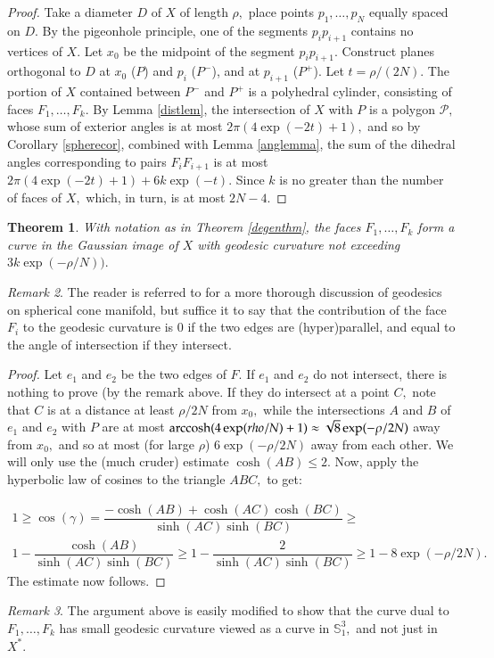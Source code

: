 \documentclass[12pt]{amsart}
\DeclareMathOperator{\acosh}{arccosh}
\newtheorem{theorem}{Theorem}
\theoremstyle{remark}
\newtheorem{remark}[theorem]{Remark}
\begin{document}
\begin{proof}
Take a diameter $D$ of $X$  of length $\rho,$ place points $p_1, \dotsc, p_N$ equally spaced on $D.$ By the pigeonhole principle, one of the segments $p_ip_{i+1}$ contains no vertices of $X.$ Let $x_0$ be the midpoint of the segment $p_ip_{i+1}.$ Construct planes orthogonal to $D$ at $x_0$ ($P$) and $p_i$ ($P^-$), and at $p_{i+1}$ ($P^+$). Let $t=\rho/(2N).$ The portion of $X$ contained between $P^-$ and $P^+$ is a polyhedral cylinder, consisting of faces $F_1, \dots, F_k.$ By Lemma \ref{distlem}, the intersection of $X$ with $P$ is a polygon $\mathcal{P},$ whose sum of exterior angles is at most $2\pi(4\exp(-2t) + 1),$ and so by Corollary \ref{spherecor}, combined with Lemma \ref{anglemma}, the sum of the dihedral angles corresponding to pairs $F_i F_{i+1}$ is at most $2\pi(4 \exp(-2t) + 1) + 6 k \exp(-t).$ Since $k$ is no greater than the number of faces of $X,$ which, in turn, is at most $2N -4.$
\end{proof}

\begin{theorem}
\label{quasig}
With notation as in Theorem \ref{degenthm}, the faces $F_1, \dotsc, F_k$ form a  curve in the Gaussian image of $X$ with geodesic curvature not exceeding $3k\exp(-\rho/N)).$
\end{theorem}
\begin{remark} The reader is referred to \cite{thes0,thes} for a more thorough discussion of geodesics on spherical cone manifold, but suffice it to say that the contribution of the face $F_i$ to the geodesic curvature is $0$ if the two edges are (hyper)parallel, and equal to the angle of intersection if they intersect.
\end{remark}
\begin{proof}
Let $e_1$ and $e_2$ be the two edges of $F.$ If $e_1$ and $e_2$ do not intersect, there is nothing to prove (by the remark above. If they do intersect at a point $C,$ note that $C$ is at a distance at least $\rho/2N$ from $x_0,$ while the intersections $A$ and $B$ of $e_1$ and $e_2$ with $P$ are at most 
$\acosh(4\exp(\-rho/N)+1) \approx \sqrt{8} \exp(-\rho/2N)$ away from $x_0,$ and so at most (for large $\rho$) $6\exp(-\rho/2N)$ away from each other. We will only use the (much cruder) estimate $\cosh(AB) \leq 2.$ Now, apply the hyperbolic law of cosines to the triangle $ABC,$ to get:

\begin{multline}
1\geq \cos(\gamma) = \dfrac{-\cosh(AB) + \cosh(AC)\cosh(BC)}{\sinh(AC) \sinh(BC)} \geq \\
1- \dfrac{\cosh(AB)}{\sinh(AC)\sinh(BC)} \geq 1- \dfrac{2}{\sinh(AC)\sinh(BC)} \geq 1 - 8 \exp(-\rho/2N).
\end{multline}
The estimate now follows.

\end{proof} 

\begin{remark}
The argument above is easily modified to show that the curve dual to $F_1, \dotsc, F_k$ has small geodesic curvature viewed as a curve in $\mathbb{S}_1^3,$ and not just in $X^*.$
\end{remark}



\end{document}
